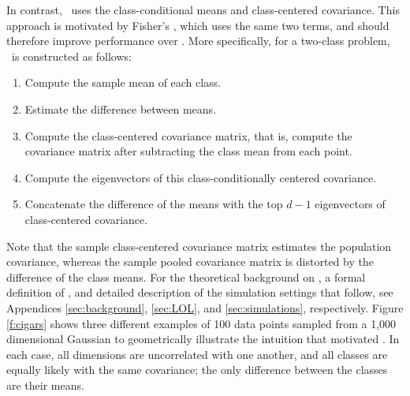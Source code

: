 \documentclass[11pt]{extarticle}
\begin{document}
In contrast, \Lol~uses the class-conditional means and class-centered covariance.
This approach is motivated  by Fisher's \Lda, which uses the same two terms, and should therefore improve performance over \Pca.
More specifically, for a two-class problem, \Lol~is constructed as follows:
\begin{enumerate}
    \item Compute the {sample mean of each class}.
    \item Estimate the difference between  means.
    \item Compute the class-centered covariance matrix, that is, compute the covariance matrix after subtracting the class mean from each point.
    \item Compute the eigenvectors of this class-conditionally centered covariance.
    \item Concatenate the difference of the means with the top $d-1$ eigenvectors of class-centered covariance.
\end{enumerate}
Note that the sample class-centered covariance matrix estimates the population covariance,
whereas the sample pooled covariance matrix is distorted by the difference of the class means.
For the theoretical background on \Lda,  a formal definition of \Lol, and detailed description of the simulation settings that follow, see Appendices \ref{sec:background}, \ref{sec:LOL}, and \ref{sec:simulations}, respectively.
%
Figure \ref{f:cigars} shows three different examples of 100 data points sampled from a 1,000 dimensional Gaussian  to geometrically illustrate the intuition that motivated \Lol.  In each case, all dimensions are uncorrelated with one another,  and all classes are equally likely with the same covariance; the only difference between the classes are their means.
\end{document}
